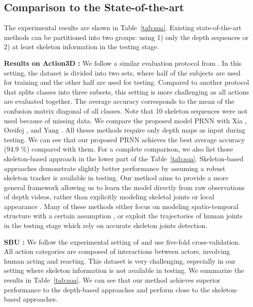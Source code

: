\documentclass[10pt,twocolumn,letterpaper]{article}
\begin{document}
\subsection{Comparison to the State-of-the-art}
\vspace{-0.1cm}
The experimental results are shown in Table~\ref{tab:soa}. Existing state-of-the-art methods can be partitioned into two groups: using 1) only the depth sequences or 2) at least skeleton information in the testing stage.

\noindent \textbf{Results on Action3D :} We follow a similar evaluation protocol from \cite{Chunyu_aaai_2016,Wang_2016_CVPR}. In this setting, the dataset is divided into two sets, where half of the subjects are used for training and the other half are used for testing. Compared to another protocol \cite{Yong_cvpr_2015} that splits classes into three subsets, this setting is more challenging as all actions are evaluated together.
The average accuracy corresponds to the mean of the confusion matrix diagonal of all classes. Note that 10 skeleton sequences were not used \cite{Jiang_tpami_2014} because of missing data. We compare the proposed model PRNN with Xia \etal \cite{Lu_cvpr_2013}, Oreifej \etal \cite{Omar_cvpr_2013}, and Yang \etal \cite{Xiaodong_2014_cvpr}. All theses methods require only depth maps as input during testing. We can see that our proposed PRNN achieves the best average accuracy (94.9 \%) compared with them. For a complete comparison, we also list those skeleton-based approach in the lower part of the Table~\ref{tab:soa}. Skeleton-based approaches demonstrate slightly better performance by assuming a robust skeleton tracker is available in testing. Our method aims to provide a more general framework allowing us to learn the model directly from raw observations of depth videos, rather than explicitly modeling skeletal joints \cite{Yong_cvpr_2015} or local appearance \cite{Veeriah_2015_ICCV}. Many of these methods either focus on modeling spatio-temporal structure with a certain assumption \cite{Omar_cvpr_2013}, or exploit the trajectories of human joints \cite{Veeriah_2015_ICCV,Zanfir_2013_ICCV} in the testing stage which rely on accurate skeleton joints detection.

\noindent \textbf{SBU :} We follow the experimental setting of \cite{kiwon_cvprw_2012,wentao_2016} and use five-fold cross-validation. All action categories are composed of interactions between actors, involving human acting and reacting. This dataset is very challenging, especially in our setting where skeleton information is not available in testing. We summarize the results in Table~\ref{tab:soa}. We can see that our method achieves superior performance to the depth-based approaches and perform close to the skeleton-based approaches.
\end{document}
